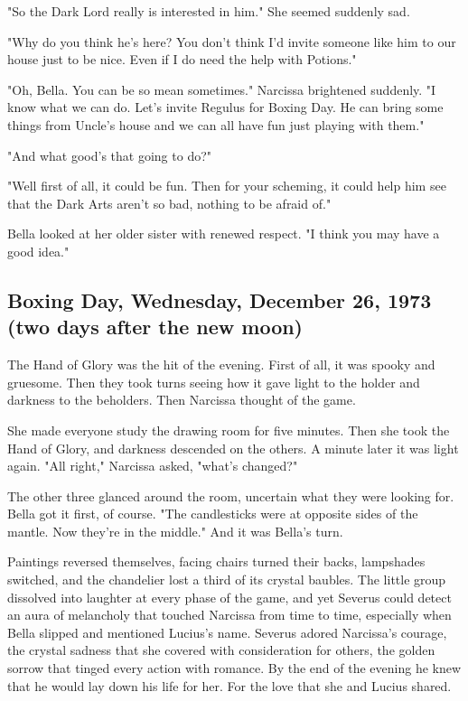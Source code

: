 "So the Dark Lord really is interested in him." She seemed suddenly sad.

"Why do you think he's here? You don't think I'd invite someone like him to our house just to be nice. Even if I do need the help with Potions."

"Oh, Bella. You can be so mean sometimes." Narcissa brightened suddenly. "I know what we can do. Let's invite Regulus for Boxing Day. He can bring some things from Uncle's house and we can all have fun just playing with them."

"And what good's that going to do?"

"Well first of all, it could be fun. Then for your scheming, it could help him see that the Dark Arts aren't so bad, nothing to be afraid of."

Bella looked at her older sister with renewed respect. "I think you may have a good idea."

\subsection{Boxing Day, Wednesday, December 26, 1973 \\ (two days after the new moon)}

The Hand of Glory was the hit of the evening. First of all, it was spooky and gruesome. Then they took turns seeing how it gave light to the holder and darkness to the beholders. Then Narcissa thought of the game.

She made everyone study the drawing room for five minutes. Then she took the Hand of Glory, and darkness descended on the others. A minute later it was light again. "All right," Narcissa asked, "what's changed?"

The other three glanced around the room, uncertain what they were looking for. Bella got it first, of course. "The candlesticks were at opposite sides of the mantle. Now they're in the middle." And it was Bella's turn.

Paintings reversed themselves, facing chairs turned their backs, lampshades switched, and the chandelier lost a third of its crystal baubles. The little group dissolved into laughter at every phase of the game, and yet Severus could detect an aura of melancholy that touched Narcissa from time to time, especially when Bella slipped and mentioned Lucius's name. Severus adored Narcissa's courage, the crystal sadness that she covered with consideration for others, the golden sorrow that tinged every action with romance. By the end of the evening he knew that he would lay down his life for her. For the love that she and Lucius shared.


